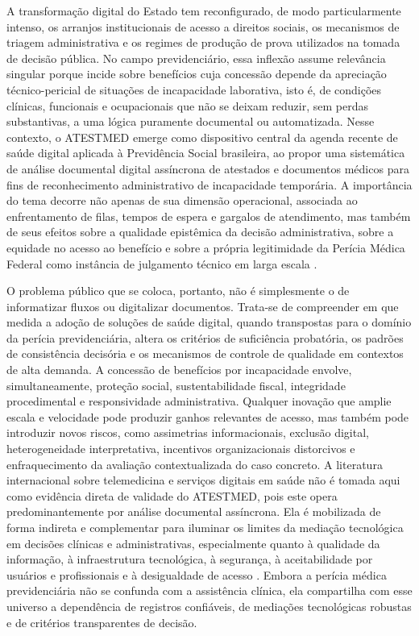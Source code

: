 \documentclass[12pt,a4paper]{article}
\begin{document}
A transformação digital do Estado tem reconfigurado, de modo particularmente intenso, os arranjos institucionais de acesso a direitos sociais, os mecanismos de triagem administrativa e os regimes de produção de prova utilizados na tomada de decisão pública. No campo previdenciário, essa inflexão assume relevância singular porque incide sobre benefícios cuja concessão depende da apreciação técnico-pericial de situações de incapacidade laborativa, isto é, de condições clínicas, funcionais e ocupacionais que não se deixam reduzir, sem perdas substantivas, a uma lógica puramente documental ou automatizada. Nesse contexto, o ATESTMED emerge como dispositivo central da agenda recente de saúde digital aplicada à Previdência Social brasileira, ao propor uma sistemática de análise documental digital assíncrona de atestados e documentos médicos para fins de reconhecimento administrativo de incapacidade temporária. A importância do tema decorre não apenas de sua dimensão operacional, associada ao enfrentamento de filas, tempos de espera e gargalos de atendimento, mas também de seus efeitos sobre a qualidade epistêmica da decisão administrativa, sobre a equidade no acesso ao benefício e sobre a própria legitimidade da Perícia Médica Federal como instância de julgamento técnico em larga escala \parencite{soares20241031t0000000000asistematicadoatestmednaconcessa}.

O problema público que se coloca, portanto, não é simplesmente o de informatizar fluxos ou digitalizar documentos. Trata-se de compreender em que medida a adoção de soluções de saúde digital, quando transpostas para o domínio da perícia previdenciária, altera os critérios de suficiência probatória, os padrões de consistência decisória e os mecanismos de controle de qualidade em contextos de alta demanda. A concessão de benefícios por incapacidade envolve, simultaneamente, proteção social, sustentabilidade fiscal, integridade procedimental e responsividade administrativa. Qualquer inovação que amplie escala e velocidade pode produzir ganhos relevantes de acesso, mas também pode introduzir novos riscos, como assimetrias informacionais, exclusão digital, heterogeneidade interpretativa, incentivos organizacionais distorcivos e enfraquecimento da avaliação contextualizada do caso concreto. A literatura internacional sobre telemedicina e serviços digitais em saúde não é tomada aqui como evidência direta de validade do ATESTMED, pois este opera predominantemente por análise documental assíncrona. Ela é mobilizada de forma indireta e complementar para iluminar os limites da mediação tecnológica em decisões clínicas e administrativas, especialmente quanto à qualidade da informação, à infraestrutura tecnológica, à segurança, à aceitabilidade por usuários e profissionais e à desigualdade de acesso \parencite{ftouni2022challengesoftelemedicineduringthecovid19pandemica}. Embora a perícia médica previdenciária não se confunda com a assistência clínica, ela compartilha com esse universo a dependência de registros confiáveis, de mediações tecnológicas robustas e de critérios transparentes de decisão.
\end{document}
